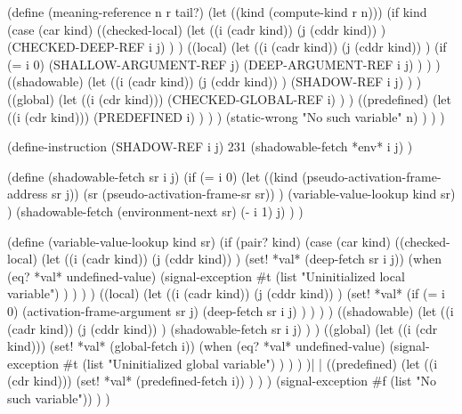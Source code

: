 \begin{code:lisp}
(define (meaning-reference n r tail?)
  (let ((kind (compute-kind r n)))
    (if kind
        (case (car kind)
          ((checked-local)
           (let ((i (cadr kind))
                 (j (cddr kind)) )
             (CHECKED-DEEP-REF i j) ) )
          ((local)
           (let ((i (cadr kind))
                 (j (cddr kind)) )
             (if (= i 0)
                 (SHALLOW-ARGUMENT-REF j)
                 (DEEP-ARGUMENT-REF i j) ) ) )
          ((shadowable)
           (let ((i (cadr kind))
                 (j (cddr kind)) )
             (SHADOW-REF i j) ) )
          ((global)
           (let ((i (cdr kind)))
             (CHECKED-GLOBAL-REF i) ) )
          ((predefined)
           (let ((i (cdr kind)))
             (PREDEFINED i) ) ) )
        (static-wrong "No such variable" n) ) ) )

(define-instruction (SHADOW-REF i j) 231
  (shadowable-fetch *env* i j) )

(define (shadowable-fetch sr i j)
  (if (= i 0)
      (let ((kind (pseudo-activation-frame-address sr j))
            (sr (pseudo-activation-frame-sr sr)) )
        (variable-value-lookup kind sr) )
      (shadowable-fetch (environment-next sr) (- i 1) j) ) )

(define (variable-value-lookup kind sr)
  (if (pair? kind)
      (case (car kind)
        ((checked-local)
         (let ((i (cadr kind))
               (j (cddr kind)) )
           (set! *val* (deep-fetch sr i j))
           (when (eq? *val* undefined-value)
             (signal-exception #t
               (list "Uninitialized local variable") ) ) ) )
        ((local)
         (let ((i (cadr kind))
               (j (cddr kind)) )
           (set! *val*
            (if (= i 0)
                (activation-frame-argument sr j)
                (deep-fetch sr i j) ) ) ) )
        ((shadowable)
         (let ((i (cadr kind))
               (j (cddr kind)) )
           (shadowable-fetch sr i j) ) )
        ((global)
         (let ((i (cdr kind)))
           (set! *val* (global-fetch i))
           (when (eq? *val* undefined-value)
             (signal-exception #t
               (list "Uninitialized global variable") ) ) ) )|%
|
        ((predefined)
         (let ((i (cdr kind)))
           (set! *val* (predefined-fetch i)) ) ) )
      (signal-exception #f (list "No such variable")) ) )
\end{code:lisp}

